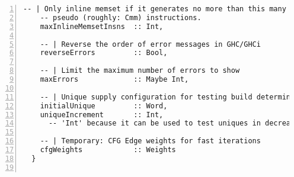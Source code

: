 \documentclass[en]{pracamgr}
\begin{document}
\begin{lstlisting}[numbers=left,stepnumber=1]
    -- | Only inline memset if it generates no more than this many
    -- pseudo (roughly: Cmm) instructions.
    maxInlineMemsetInsns  :: Int,
  
    -- | Reverse the order of error messages in GHC/GHCi
    reverseErrors         :: Bool,
  
    -- | Limit the maximum number of errors to show
    maxErrors             :: Maybe Int,
  
    -- | Unique supply configuration for testing build determinism
    initialUnique         :: Word,
    uniqueIncrement       :: Int,
      -- 'Int' because it can be used to test uniques in decreasing order.
  
    -- | Temporary: CFG Edge weights for fast iterations
    cfgWeights            :: Weights
  }
  
\end{lstlisting}
\end{document}
